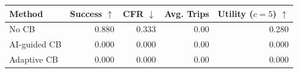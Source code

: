 \begin{tabular}{lrrrr}
\toprule
Method & Success $\uparrow$ & CFR $\downarrow$ & Avg. Trips & Utility ($c=5$) $\uparrow$ \\
\midrule
No CB & 0.880 & 0.333 & 0.00 & 0.280 \\
AI-guided CB & 0.000 & 0.000 & 0.00 & 0.000 \\
Adaptive CB & 0.000 & 0.000 & 0.00 & 0.000 \\
\bottomrule
\end{tabular}
